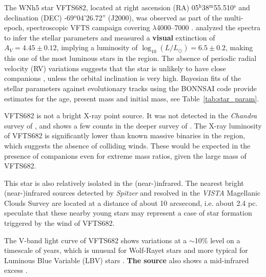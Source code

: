 \documentclass[a4paper,fleqn,usenatbib]{mnras}
\newcommand{\newtext}[1]{{\color{ForestGreen}\bf{#1}}}
\DeclareRobustCommand{\Tabref}[1]{Table~\ref{#1}}
\begin{document}
The WNh5 star VFTS682, located at right ascension (RA)
05$^\mathrm{h}$38$^\mathrm{m}$55.510$^\mathrm{s}$  and declination
(DEC) \mbox{-69$^\mathrm{o}$04'26.72''} (J2000), was observed as part of the multi-epoch, spectroscopic VFTS campaign covering $\lambda$4000--7000 \citep[][]{evans:11}. 
\citet{bestenlehner:11}  analyzed the spectra to infer the stellar
parameters and measured a \newtext{visual} extinction of $A_V=4.45\pm0.12$, implying a
luminosity of $\log_{10}(L/L_\odot) =  6.5\pm0.2$, making this one of
the most luminous stars in the region. The absence of periodic radial
velocity (RV)
variations suggests that the star is unlikely to have close
companions \citep[][]{bestenlehner:11}, unless the orbital inclination is
very high. Bayesian fits of the stellar
parameters against evolutionary tracks \citep{brott:11, kohler:15}
using the BONNSAI code \citep{schneider:14,schneider:17} provide
estimates for the age, present mass and initial mass, %
see
\Tabref{tab:star_param}. %

VFTS682 is not a bright X-ray point source. It was not detected in the
\emph{Chandra} survey of \cite{townsley:06}, and shows a few counts in
the deeper survey of \cite{townsley:14}.
The X-ray luminosity of VFTS682
is significantly lower than known massive binaries in the region, which suggests the absence of
colliding winds. These would be expected in the presence of companions
even for extreme mass ratios, given the large mass of
VFTS682.

This star is also relatively isolated in the \mbox{(near-)infrared}. The nearest bright (near-)infrared sources detected by
\emph{Spitzer} \citep{meixner:06} and resolved in the \emph{VISTA}
Magellanic Clouds Survey \citep{cioni:11} are located at a distance of
about 10 arcsecond, i.e. about 2.4 pc. \cite{walborn:13} speculate
that these nearby young stars may represent a case of star formation triggered by the wind of VFTS682.

The V-band light curve of VFTS682  shows
variations at a $\sim$10\% level on a timescale of years, which is
unusual for Wolf-Rayet stars and more typical for Luminous Blue
Variable (LBV) stars \citep{udalski:08, bestenlehner:11}. \newtext{The source} also
shows a mid-infrared excess \citep{gruendl:09}.
\end{document}
